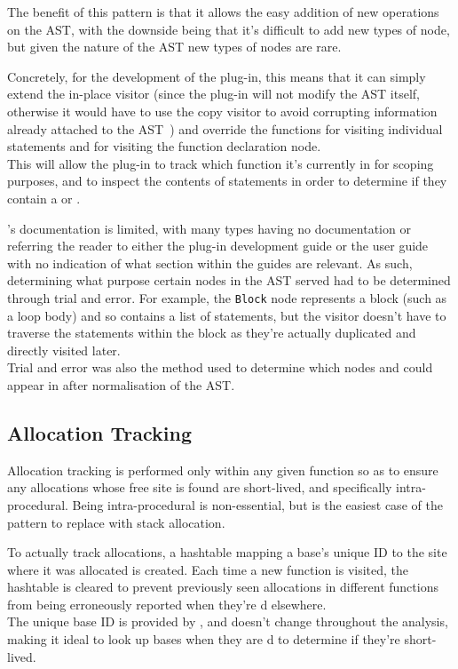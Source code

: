 The benefit of this pattern is that it allows the easy addition of new operations on the AST, with the downside being that it's difficult to add new types of node, but given the nature of the AST new types of nodes are rare.

Concretely, for the development of the plug-in, this means that it can simply extend the in-place visitor (since the plug-in will not modify the AST itself, otherwise it would have to use the copy visitor to avoid corrupting information already attached to the AST~\cite{framaplug}) and override the functions for visiting individual statements and for visiting the function declaration node. \\
This will allow the plug-in to track which function it's currently in for scoping purposes, and to inspect the contents of statements in order to determine if they contain a \malloc{} or \free{}.

's documentation is limited, with many types having no documentation or referring the reader to either the plug-in development guide or the user guide with no indication of what section within the guides are relevant. As such, determining what purpose certain nodes in the AST served had to be determined through trial and error. For example, the \texttt{Block} node represents a block (such as a loop body) and so contains a list of statements, but the visitor doesn't have to traverse the statements within the block as they're actually duplicated and directly visited later.\\
Trial and error was also the method used to determine which nodes \malloc{} and \free{} could appear in after normalisation of the AST\@.

\subsection{Allocation Tracking}\label{alloctrack}

Allocation tracking is performed only within any given function so as to ensure any allocations whose free site is found are short-lived, and specifically intra-procedural. Being intra-procedural is non-essential, but is the easiest case of the pattern to replace with stack allocation.

To actually track allocations, a hashtable mapping a base's unique ID to the site where it was allocated is created. Each time a new function is visited, the hashtable is cleared to prevent previously seen allocations in different functions from being erroneously reported when they're \free{}d elsewhere.\\
The unique base ID is provided by , and doesn't change throughout the analysis, making it ideal to look up bases when they are \free{}d to determine if they're short-lived.

